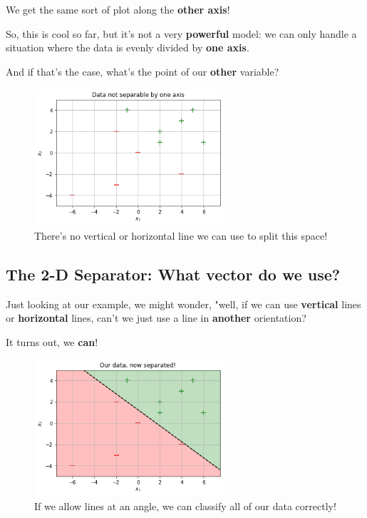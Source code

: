         We get the same sort of plot along the \textbf{other axis}!
        
        So, this is cool so far, but it's not a very \textbf{powerful} model: we can only handle a situation where the data is evenly divided by \textbf{one axis}.
        
        And if that's the case, what's the point of our \textbf{other} variable?
        
        \begin{figure}[H]
            \centering
                \includegraphics[width=70mm,scale=0.5]{images/classification_images/data_not_1d_separable.png}
                
                \caption*{There's no vertical or horizontal line we can use to split this space!}
        \end{figure}
        
    \subsection{The 2-D Separator: What vector do we use?}
    
        Just looking at our example, we might wonder, "well, if we can use \textbf{vertical} lines or \textbf{horizontal} lines, can't we just use a line in \textbf{another} orientation?
        
        It turns out, we \textbf{can}!
        
        \begin{figure}[H]
            \centering
                \includegraphics[width=70mm,scale=0.5]{images/classification_images/data_2d_separable.png}
                
                \caption*{If we allow lines at an angle, we can classify all of our data correctly!}
        \end{figure}
        

